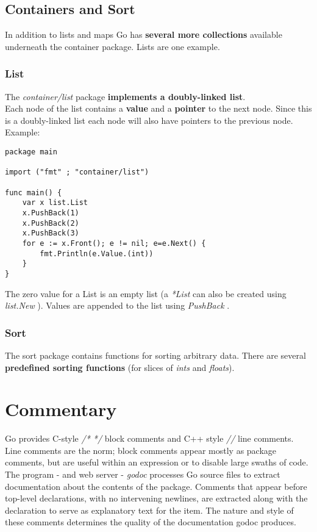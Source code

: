 \documentclass[10pt,letterpaper]{report}
\begin{document}
\section{Containers and Sort}
In addition to lists and maps Go has \textbf{several more collections} available underneath the container package. Lists are one example.
\subsection{List}
The \textit{container/list} package \textbf{implements a doubly-linked list}.\\
Each node of the list contains a \textbf{value} and a \textbf{pointer} to the next node. Since this is a doubly-linked list each node will also have pointers to the previous node. Example:
\begin{lstlisting}
package main

import ("fmt" ; "container/list")

func main() {
	var x list.List
	x.PushBack(1)
	x.PushBack(2)
	x.PushBack(3)
	for e := x.Front(); e != nil; e=e.Next() {
		fmt.Println(e.Value.(int))
	}
}
\end{lstlisting}
The zero value for a List is an empty list (a \textit{*List} can also be created using \textit{list.New} ). Values are appended to the list using \textit{PushBack} .
\subsection{Sort}
The sort package contains functions for sorting arbitrary data. There are several \textbf{predefined sorting functions} (for slices of \textit{ints} and \textit{floats}).
\chapter{Commentary}
Go provides C-style \textit{/* */} block comments and C++ style \textit{//} line comments. Line comments are the norm; block comments appear mostly as package comments, but are useful within an expression or to disable large swaths of code.\\
The program - and web server - \textit{godoc} processes Go source files to extract documentation about the contents of the package. Comments that appear before top-level declarations, with no intervening newlines, are extracted along with the declaration to serve as explanatory text for the item. The nature and style of these comments determines the quality of the documentation godoc produces. 
\end{document}
